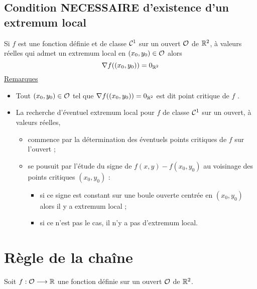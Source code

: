 \subsection{Condition NECESSAIRE d’existence d’un extremum local}
\begin{defprop}
    Si \(f\) est une fonction définie et de classe \(\cal{C}^{1}\) sur un ouvert \(\cal{O}\) de \(\R^2\), à valeurs réelles qui admet un extremum local en \((x_0, y_0) \in \cal{O}\) alors
    \[\nabla f ((x_0, y_0)) = 0_{\R^2}\] 
    \underline{Remarques}\\
    \begin{itemize}
        \item Tout \((x_0, y_0) \in \cal{O}\) tel que \(\nabla f ((x_0, y_0)) = 0_{\R^2}\) est dit point critique de \(f\) .
        \item La recherche d’éventuel extremum local pour \(f\) de classe \(\cal{C}^{1}\) sur un ouvert, à valeurs réelles,
        \begin{itemize}
            \item commence par la détermination des éventuels points critiques de \(f\) sur l’ouvert ;
            \item se pousuit par l’étude du signe de \(f (x, y) - f (x_0, y_0)\) au voisinage des points critiques \((x_0, y_0)\) :
            \begin{itemize}
                \item si ce signe est constant sur une boule ouverte centrée en \((x_0, y_0)\) alors il y a extremum local ;
                \item si ce n’est pas le cas, il n’y a pas d’extremum local.
            \end{itemize}
        \end{itemize}
    \end{itemize}
\end{defprop}
\section{Règle de la chaîne}
Soit \(f : \cal{O} \to  \R\) une fonction définie sur un ouvert \(\cal{O}\) de \(\R^2\).
